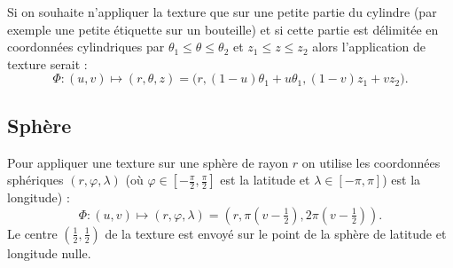 \documentclass[11pt,class=report,crop=false]{standalone}
\begin{document}
Si on souhaite n'appliquer la texture que sur une petite partie du cylindre (par exemple une petite étiquette sur un bouteille) et si cette partie est délimitée en coordonnées cylindriques par $\theta_1 \le \theta \le \theta_2$ et $z_1 \le z \le z_2$ alors l'application de texture serait :
$$\Phi : (u,v)  \longmapsto (r, \theta, z) = \big(r, (1-u)\theta_1+u\theta_1 , (1-v)z_1+vz_2 \big).$$
 
 
\subsection{Sphère}

Pour appliquer une texture sur une sphère de rayon $r$ on utilise les coordonnées sphériques $(r,\varphi,\lambda)$ (où $\varphi \in [-\frac\pi2,\frac\pi2]$ est la latitude et $\lambda\in [-\pi,\pi]$)  est la longitude) :
$$\Phi : (u,v)  \longmapsto (r,\varphi,\lambda) = \left(r, \pi(v-\tfrac12), 2\pi(v-\tfrac12)\right).$$
Le centre $(\frac12,\frac12)$ de la texture est envoyé sur le point de la sphère de latitude et longitude nulle.
\end{document}
